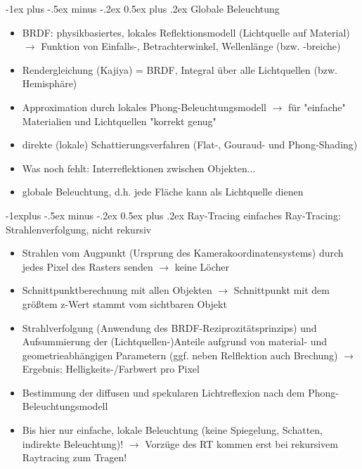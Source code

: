 \documentclass[10pt,landscape]{article}
\makeatletter
\renewcommand{\section}{\@startsection{section}{1}{0mm}%
                                {-1ex plus -.5ex minus -.2ex}%
                                {0.5ex plus .2ex}%
                                {\normalfont\large\bfseries}}
\renewcommand{\subsection}{\@startsection{subsection}{2}{0mm}%
                                {-1explus -.5ex minus -.2ex}%
                                {0.5ex plus .2ex}%
                                {\normalfont\normalsize\bfseries}}
\makeatother
\begin{document}
\begin{multicols}{3}
{  \section{Globale Beleuchtung}
  \begin{itemize}
    \item BRDF: physikbasiertes, lokales Reflektionsmodell (Lichtquelle auf Material) $\rightarrow$ Funktion von Einfalls-, Betrachterwinkel, Wellenlänge (bzw. -breiche)
    \item Rendergleichung (Kajiya) = BRDF, Integral über alle Lichtquellen (bzw. Hemisphäre)
    \item Approximation durch lokales Phong-Beleuchtungsmodell $\rightarrow$ für "einfache" Materialien und Lichtquellen "korrekt genug"
    \item direkte (lokale) Schattierungsverfahren (Flat-, Gouraud- und Phong-Shading)
    \item Was noch fehlt: Interreflektionen zwischen Objekten...
    \item globale Beleuchtung, d.h. jede Fläche kann als Lichtquelle dienen
  \end{itemize}
  
  \subsection{ Ray-Tracing}
  einfaches Ray-Tracing: Strahlenverfolgung, nicht rekursiv
  \begin{itemize}
    \item Strahlen vom Augpunkt (Ursprung des Kamerakoordinatensystems) durch jedes Pixel des Rasters senden $\rightarrow$ keine Löcher
    \item Schnittpunktberechnung mit allen Objekten $\rightarrow$ Schnittpunkt mit dem größtem z-Wert stammt vom sichtbaren Objekt
    \item Strahlverfolgung (Anwendung des BRDF-Reziprozitätsprinzips) und Aufsummierung der (Lichtquellen-)Anteile aufgrund von material- und geometrieabhängigen Parametern (ggf. neben Relflektion auch Brechung) $\rightarrow$ Ergebnis: Helligkeits-/Farbwert pro Pixel
    \item Bestimmung der diffusen und spekularen Lichtreflexion nach dem Phong-Beleuchtungsmodell
    \item Bis hier nur einfache, lokale Beleuchtung (keine Spiegelung, Schatten, indirekte Beleuchtung)! $\rightarrow$ Vorzüge des RT kommen erst bei rekursivem Raytracing zum Tragen!
  \end{itemize}
  
}
\end{multicols}
\end{document}
